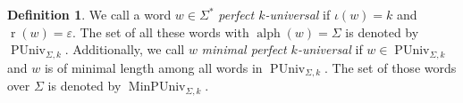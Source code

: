 \documentclass[10pt,a4paper]{amsart}
\def\ta{\mathtt{a}}
\def\tb{\mathtt{b}}
\def\tc{\mathtt{c}}
\def\r{\operatorname{r}}
\def\re{\operatorname{r}}
\def\m{\operatorname{m}}
\renewcommand{\epsilon}{\varepsilon}
\DeclareMathOperator{\ar}{ar}
\DeclareMathOperator{\letters}{alph}
\DeclareMathOperator{\PerfUniv}{PUniv}
\DeclareMathOperator{\MinPerfUniv}{MinPUniv}
\newcommand{\rev}[1]{\mathpalette\harpoonvec{#1}}
\newcommand{\harpvecsign}{\scriptscriptstyle\leftharpoonup}
\newcommand{\harpoonvec}[2]{%
	\ifx\displaystyle#1\doalign{$\harpvecsign$}{#1#2}\fi
	\ifx\textstyle#1\doalign{$\harpvecsign$}{#1#2}\fi
	\ifx\scriptstyle#1\doalign{\scalebox{.6}[.9]{$\harpvecsign$}}{#1#2}\fi
	\ifx\scriptscriptstyle#1\doalign{\scalebox{.5}[.8]{$\harpvecsign$}}{#1#2}\fi
}
\newcommand{\doalign}[2]{%
	{\vbox{\offinterlineskip\ialign{\hfil##\hfil\cr#1\cr$#2$\cr}}}%
}
\DeclareMathOperator\w{\rev\m}
\DeclareMathOperator\ra{\rev\ar}
\DeclareMathOperator\er{\rev\r}
\newcommand{\todoah}[1]{\todo[color=violet,inline, textcolor = white]{#1}}
\theoremstyle{plain}
\theoremstyle{definition}
\newtheorem{definition}{Definition}
\begin{document}
\begin{definition}
	We call a word $w \in \Sigma^*$ \emph{perfect $k$-universal} if $\iota(w)=k$ and $\r(w) = \epsilon$. The set of all these words with $\letters(w)=\Sigma$ is denoted by $\PerfUniv_{\Sigma,k}$.
	Additionally, we call $w$ \emph{minimal perfect $k$-universal} if $w\in\PerfUniv_{\Sigma,k}$ and $w$ is of minimal length among all words in $\PerfUniv_{\Sigma,k}$.
	The set of those words over $\Sigma$ is denoted by $\MinPerfUniv_{\Sigma,k}$.
\end{definition}

%
%
%
\end{document}
